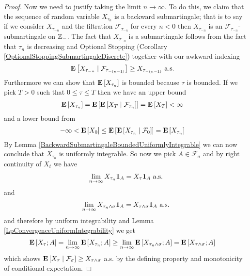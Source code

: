 \begin{proof}
Now we need to justify taking the limit $n \to \infty$.  To do this,
we claim that the sequence of random variable $X_{\tau_n}$ 
is a backward submartingale; that is to say if we consider
$X_{\tau_{-n}}$ and the filtration
$\mathcal{F}_{\tau_{-n}}$ for every $n < 0$
then $X_{\tau_{-n}}$ is an $\mathcal{F}_{\tau_{-n}}$-submartingale on
$\integers_-$.  The fact that $X_{\tau_{-n}}$ is a submartingale
follows from the fact that $\tau_n$ is decreasing and Optional
Stopping (Corollary \ref{OptionalStoppingSubmartingaleDiscrete})
together
with our awkward indexing
\begin{align*}
\cexpectationlong{\mathcal{F}_{\tau_{-(n-1)}}}{X_{\tau_{-n}}} &\geq
X_{\tau_{-(n-1)}} \text{ a.s.}
\end{align*}
Furthermore we can show that $\expectation{X_{\tau_n}}$ is bounded
because $\tau$ is bounded.
If we pick $T > 0$ such that $0 \leq \tau \leq T$ then we have an upper bound
\begin{align*}
\expectation{X_{\tau_{n}}}
&=\expectation{\cexpectationlong{\mathcal{F}_{\tau_n}}{X_{T}}} =
\expectation{X_T} < \infty
\end{align*}
and a lower bound from 
\begin{align*}
-\infty &< \expectation{X_0} \leq
\expectation{\cexpectationlong{\mathcal{F}_0}{X_{\tau_n}}} = \expectation{X_{\tau_n}}
\end{align*}
By Lemma \ref{BackwardSubmartingaleBoundedUniformlyIntegrable} we can
now conclude that $X_{\tau_{n}}$ is uniformly integrable.
So now we pick $A \in \mathcal{F}_{\sigma}$ and by right continuity of
$X_t$ we have
\begin{align*}
\lim_{n \to \infty} X_{\tau_n} \characteristic{A} = X_\tau
\characteristic{A} \text{ a.s.}
\end{align*}
and
\begin{align*}
\lim_{n \to \infty} X_{\tau_n \wedge \sigma} \characteristic{A} =
X_{\tau \wedge \sigma}
\characteristic{A} \text{ a.s.}
\end{align*}
and therefore by uniform integrability and Lemma
\ref{LpConvergenceUniformIntegrability} we get
\begin{align*}
\expectation{X_\tau ; A} &= \lim_{n \to \infty}
\expectation{X_{\tau_n} ; A} \geq 
\lim_{n \to \infty} \expectation{X_{\tau_n \wedge \sigma} ; A} =
\expectation{X_{\tau \wedge \sigma} ; A}
\end{align*}
which shows $\cexpectationlong{\mathcal{F}_\sigma}{X_\tau} \geq
X_{\tau \wedge \sigma}$ a.s. by the defining property and monotonicity
of conditional expectation.
\end{proof}


